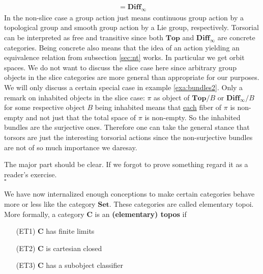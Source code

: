 \begin{exa}
\begin{enumerate}
\begin{align*}
  =
  \mathbf{Diff}_{\infty}
\end{align*}
In the non-slice case a group action just means continuous group action by a topological group and smooth group action by a Lie group, respectively. Torsorial can be interpreted as free and transitive since both $\mathbf{Top}$ and $\mathbf{Diff}_{\infty}$ are concrete categories. Being concrete also means that the idea of an action yielding an equivalence relation from subsection \ref{sec:nt} works. In particular we get orbit spaces. We do not want to discuss the slice case here since arbitrary group objects in the slice categories are more general than appropriate for our purposes. We will only discuss a certain special case in example \ref{exa:bundles2}. Only a remark on inhabited objects in the slice case: $\pi$ as object of $\mathbf{Top} \slash B$ or $\mathbf{Diff}_{\infty} \slash B$ for some respective object $B$ being inhabited means that \underline{each} fiber of $\pi$ is non-empty and not just that the total space of $\pi$ is non-empty. So the inhabited bundles are the surjective ones. Therefore one can take the general stance that torsors are just the interesting torsorial actions since the non-surjective bundles are not of so much importance we daresay.
\end{enumerate}
\end{exa}
\begin{prf}
The major part should be clear. If we forgot to prove something regard it as a reader's exercise.
\\
\phantom{proven}
\hfill
$\square$
\end{prf}
We have now internalized enough conceptions to make certain categories behave more or less like the category $\mathbf{Set}$. These categories are called elementary topoi. More formally, a category $\mathbf{C}$ is an \textbf{(elementary) topos} if
\begin{enumerate}
\item[(ET1)]
$\mathbf{C}$ has finite limits
\item[(ET2)]
$\mathbf{C}$ is cartesian closed
\item[(ET3)]
$\mathbf{C}$ has a subobject classifier
\end{enumerate}

